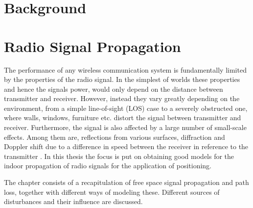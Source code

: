 \documentclass{LTHthesis}
\begin{document}
\chapter{Background}

\chapter{Radio Signal Propagation}
%
\label{chap:RSP}
%
The performance of any wireless communication system is fundamentally limited by the properties of the radio signal. In the simplest of worlds these properties and hence the signals power, would only depend on the distance between transmitter and receiver. However, instead they vary greatly depending on the environment, from a simple line-of-sight (LOS) case to a severely obstructed one, where walls, windows, furniture etc. distort the signal between transmitter and receiver. Furthermore, the signal is also affected by a large number of small-scale effects. Among them are, reflections from various surfaces, diffraction and Doppler shift due to a difference in speed between the receiver in reference to the transmitter \cite{rappaport96}. In this thesis the focus is put on obtaining good models for the indoor propagation of radio signals for the application of positioning. 

The chapter consists of a recapitulation of free space signal propagation and path loss, together with different ways of modeling these. Different sources of disturbances and their influence are discussed. 
%
\end{document}
